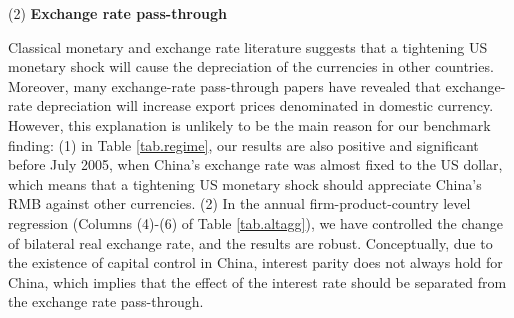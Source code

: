 (2) \textbf{Exchange rate pass-through} 

Classical monetary and exchange rate literature suggests that a tightening US monetary shock will cause the depreciation of the currencies in other countries. Moreover, many exchange-rate pass-through papers have revealed that exchange-rate depreciation will increase export prices denominated in domestic currency. However, this explanation is unlikely to be the main reason for our benchmark finding: (1) in Table \ref{tab.regime}, our results are also positive and significant before July 2005, when China’s exchange rate was almost fixed to the US dollar, which means that a tightening US monetary shock should appreciate China's RMB against other currencies. (2) In the annual firm-product-country level regression (Columns (4)-(6) of Table \ref{tab.altagg}), we have controlled the change of bilateral real exchange rate, and the results are robust. Conceptually, due to the existence of capital control in China, interest parity does not always hold for China, which implies that the effect of the interest rate should be separated from the exchange rate pass-through.

